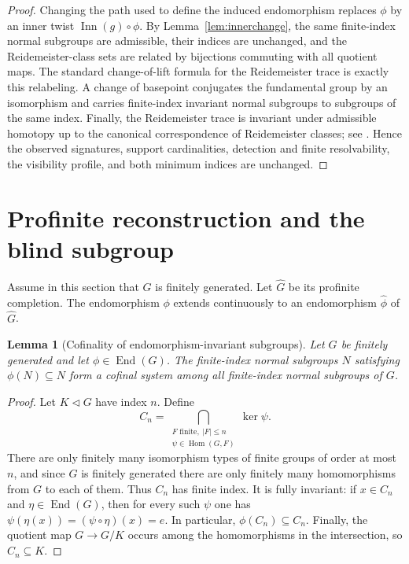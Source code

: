 \documentclass[11pt]{article}
\newtheorem{lemma}[theorem]{Lemma}
\DeclareMathOperator{\End}{End}
\DeclareMathOperator{\Inn}{Inn}
\newcommand{\wideG}{\widehat G}
\newcommand{\phihat}{\widehat\phi}
\begin{document}
\begin{proof}
Changing the path used to define the induced endomorphism replaces $\phi$ by
an inner twist $\Inn(g)\circ\phi$.  By Lemma~\ref{lem:innerchange}, the same
finite-index normal subgroups are admissible, their indices are unchanged,
and the Reidemeister-class sets are related by bijections commuting with all
quotient maps.  The standard change-of-lift formula for the Reidemeister trace
is exactly this relabeling.  A change of basepoint conjugates the fundamental
group by an isomorphism and carries finite-index invariant normal subgroups to
subgroups of the same index.  Finally, the Reidemeister trace is invariant
under admissible homotopy up to the canonical correspondence of Reidemeister
classes; see \cite{Jiang,Staecker}.  Hence the observed signatures, support cardinalities, detection and finite
resolvability, the visibility profile, and both minimum indices are
unchanged.
\end{proof}

\section{Profinite reconstruction and the blind subgroup}

Assume in this section that $G$ is finitely generated.  Let $\wideG$ be its
profinite completion.  The endomorphism $\phi$ extends continuously to an
endomorphism $\phihat$ of $\wideG$.

\begin{lemma}[Cofinality of endomorphism-invariant subgroups]
\label{lem:cofinal}
Let $G$ be finitely generated and let $\phi\in\End(G)$.  The finite-index
normal subgroups $N$ satisfying $\phi(N)\subseteq N$ form a cofinal system
among all finite-index normal subgroups of $G$.
\end{lemma}

\begin{proof}
Let $K\triangleleft G$ have index $n$.  Define
\[
  C_n=\bigcap_{\substack{F\text{ finite},\ |F|\le n\\
                         \psi\in\operatorname{Hom}(G,F)}}\ker\psi.
\]
There are only finitely many isomorphism types of finite groups of order at
most $n$, and since $G$ is finitely generated there are only finitely many
homomorphisms from $G$ to each of them.  Thus $C_n$ has finite index.  It is
fully invariant: if $x\in C_n$ and $\eta\in\End(G)$, then for every such
$\psi$ one has $\psi(\eta(x))=(\psi\circ\eta)(x)=e$.  In particular,
$\phi(C_n)\subseteq C_n$.  Finally, the quotient map $G\to G/K$ occurs among
the homomorphisms in the intersection, so $C_n\subseteq K$.
\end{proof}
\end{document}

